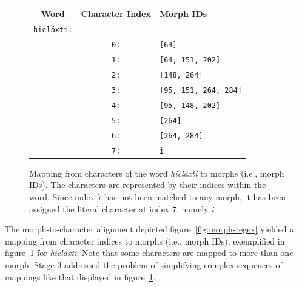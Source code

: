 {\begin{figure}[t]
\centering
\setlength{\extrarowheight}{6pt}
\begin{tabular}{ccl}
\toprule
Word & Character Index & Morph IDs\\
\midrule
\texttt{hicl\'{a}xti:} & &\\
&  \texttt{0:} & \texttt{[64]} \\
& \texttt{1:} & \texttt{[64, 151, 202]} \\
& \texttt{2:} & \texttt{[148, 264]} \\
& \texttt{3:} & \texttt{[95, 151, 264, 284]} \\
& \texttt{4:} & \texttt{[95, 148, 202]} \\
& \texttt{5:} & \texttt{[264]} \\
& \texttt{6:} & \texttt{[264, 284]} \\
& \texttt{7:} & \texttt{i} \\
\bottomrule
\end{tabular}
\caption{Mapping from characters of the word \textit{hicl\'{a}xti} to morphs (i.e., morph IDs). The characters are represented by their indices within the word. Since index 7 has not been matched to any morph, it has been assigned the literal character at index 7, namely \textit{i}.}
\label{fig:chars-to-morphs-tab}
\end{figure}

The morph-to-character alignment depicted figure~\ref{fig:morph-regex} yielded
a mapping from character indices to morphs (i.e., morph IDs), exemplified in 
figure~\ref{fig:chars-to-morphs-tab} for \textit{hicl\'{a}xti}. Note that
some characters are mapped to more than one morph. 
Stage 3 addressed the problem of simplifying complex sequences of mappings 
like that displayed in figure~\ref{fig:chars-to-morphs-tab}.

}
